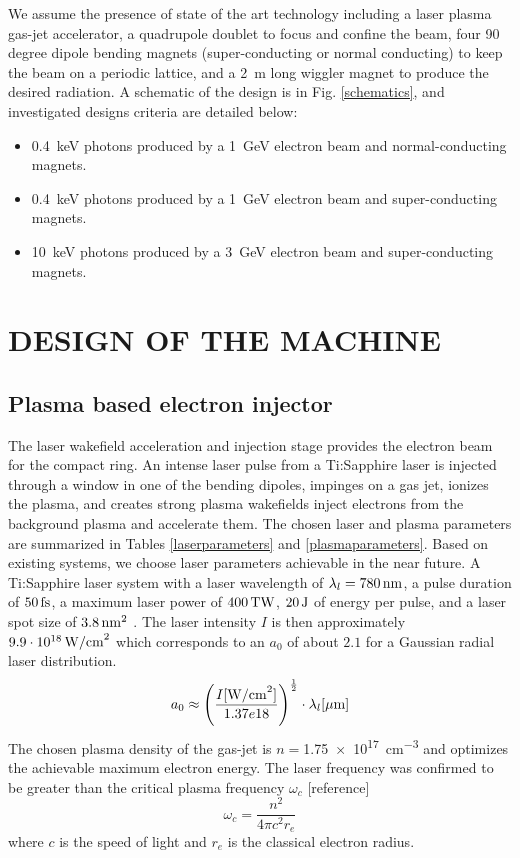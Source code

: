 \documentclass[a4paper,
              ]{jacow}
\begin{document}
We assume the presence of state of the art technology including a laser plasma gas-jet accelerator, a quadrupole doublet to focus and confine the beam, four 90 degree dipole bending magnets (super-conducting or normal conducting) to keep the beam on a periodic lattice, and a \SI{2}{m} long wiggler magnet to produce the desired radiation. A schematic of the design is in Fig. \ref{schematics}, and investigated designs criteria are detailed below: 
\begin{itemize}
\item \SI{0.4}{keV} photons produced by a \SI{1}{GeV} electron beam and normal-conducting magnets.
\item \SI{0.4}{keV} photons produced by a \SI{1}{GeV} electron beam and super-conducting magnets.
\item \SI{10}{keV} photons produced by a \SI{3}{GeV} electron beam and super-conducting magnets.
\end{itemize}

\section{DESIGN OF THE MACHINE}
\subsection{Plasma based electron injector}

The laser wakefield acceleration and injection stage provides the electron beam for the compact ring. An intense laser pulse from a Ti:Sapphire laser is injected through a window in one of the bending dipoles, impinges on a gas jet, ionizes the plasma, and creates strong plasma wakefields inject electrons from the background plasma and accelerate them. The chosen laser and plasma parameters are summarized in Tables \ref{laserparameters} and \ref{plasmaparameters}.
Based on existing systems, we choose laser parameters achievable in the near future. A Ti:Sapphire laser system with a laser wavelength of $\lambda_l = 780\,\rm{nm}$, a pulse duration of $50\,\rm{fs}$, a maximum laser power of $400\,\rm{TW}$, $20\,\rm{J}$ of energy per pulse, and a laser spot size of $3.8\,\rm{nm}^2$ \cite{LASER}. The laser intensity $I$ is then approximately $9.9\cdot10^{18}\,\rm{W/cm}^2$ which corresponds to an $a_0$ of about $2.1$ for a Gaussian radial laser distribution. 
\begin{equation}
a_0 \approx \left( \frac{I [\rm{W/cm}^2]}{1.37e18} \right) ^{\frac{1}{2}} \cdot \lambda_l[\mu\rm{m}]
\end{equation}
The chosen plasma density of the gas-jet is $n = $\SI{1.75e17}{cm^{-3}} and optimizes the achievable maximum electron energy. The laser frequency was confirmed to be greater than the critical plasma frequency $\omega_c$ [reference]
\begin{equation}
\omega_c = \frac{n^2}{4 \pi c^2 r_e}
\end{equation}
where $c$ is the speed of light and $r_e$ is the classical electron radius.
\end{document}

